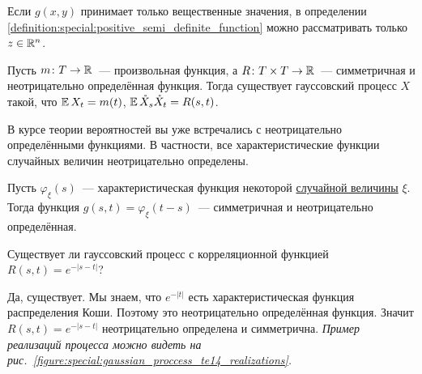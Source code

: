 \begin{remark}
    \label{remark:special:positive_semi_definite_function_for_reals}
    Если $ g(x, y) $ принимает только вещественные значения,
    в определении \ref{definition:special:positive_semi_definite_function} можно рассматривать только $ z \in \mathbb{R}^n $.
\end{remark}

\begin{statement}
    \label{statement:special:mean_and_cov_define_gaussian_process}
    Пусть $ m \colon T \to \mathbb{R} $~--- произвольная функция,
    а $ R \colon T \times T \to \mathbb{R} $~--- симметричная и неотрицательно определённая функция.
    Тогда существует гауссовский процесс $ X $ такой, что $ \operatorname{\mathbb{E}} X_t = m(t) $, $ \operatorname{\mathbb{E}} \mathring{X}_s \mathring{X}_t = R(s, t) $.
\end{statement}

В курсе теории вероятностей вы уже встречались с неотрицательно определёнными функциями.
В частности, все характеристические функции случайных величин неотрицательно определены.

\begin{statement}
    \label{statement:special:characteristic_function_is_positive_semi_definite}
    Пусть $ \varphi_\xi(s) $~--- характеристическая функция некоторой \uline{случайной величины} $ \xi $.
    Тогда функция $ g(s, t) = \varphi_\xi(t - s) $~--- симметричная и неотрицательно определённая.
\end{statement}

\begin{exercise}
    \label{exercise:special:gaussian_from_characteristic_function_of_Cauchy}
    Существует ли гауссовский процесс с корреляционной функцией $ R(s, t) = e^{-|s - t|} $?
\end{exercise}

\begin{solution}
    Да, существует.
    Мы знаем, что $e^{-|t|} $ есть характеристическая функция распределения Коши.
    Поэтому это неотрицательно определённая функция.
    Значит $ R(s, t) = e^{-|s - t|} $ неотрицательно определена и симметрична.
    \newline
    \textit{Пример реализаций процесса
    можно видеть на рис.~\ref{figure:special:gaussian_proccess_te14_realizations}.}
\end{solution}

